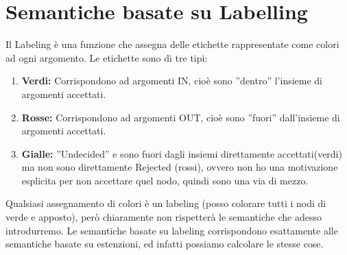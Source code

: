 \section{Semantiche basate su Labelling}
Il Labeling è una funzione che assegna delle etichette rappresentate come colori ad ogni argomento. Le etichette sono di tre tipi:
\begin{enumerate}
    \item \textbf{Verdi:} Corrispondono ad argomenti IN, cioè sono ”dentro” l’insieme di argomenti accettati.
    \item \textbf{Rosse:} Corrispondono ad argomenti OUT, cioè sono ”fuori” dall’insieme di argomenti accettati.
    \item \textbf{Gialle:} ”Undecided” e sono fuori dagli insiemi direttamente accettati(verdi) ma non sono direttamente Rejected (rossi), ovvero non ho una motivazione esplicita per non accettare quel nodo, quindi sono una via di mezzo.
\end{enumerate}
Qualsiasi assegnamento di colori è un labeling (posso colorare tutti i nodi di verde e apposto), però chiaramente non rispetterà le semantiche che adesso introdurremo. Le semantiche basate su labeling corrispondono esattamente alle semantiche basate su estenzioni, ed infatti possiamo calcolare le stesse
cose.

